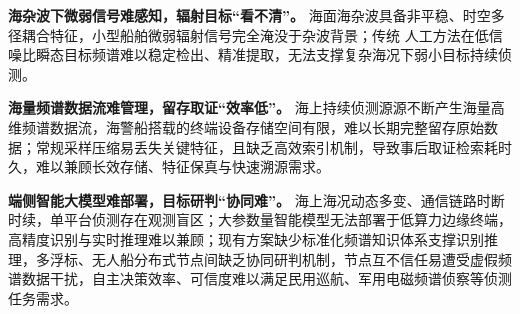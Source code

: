 \textbf{海杂波下微弱信号难感知，辐射目标“看不清”。}
海面海杂波具备非平稳、时空多径耦合特征，小型船舶微弱辐射信号完全淹没于杂波背景；传统
人工方法在低信噪比瞬态目标频谱难以稳定检出、精准提取，无法支撑复杂海况下弱小目标持续侦测。

\textbf{海量频谱数据流难管理，留存取证“效率低”。}
海上持续侦测源源不断产生海量高维频谱数据流，海警船搭载的终端设备存储空间有限，难以长期完整留存原始数据；常规采样压缩易丢失关键特征，且缺乏高效索引机制，导致事后取证检索耗时久，难以兼顾长效存储、特征保真与快速溯源需求。

\textbf{端侧智能大模型难部署，目标研判“协同难”。}
海上海况动态多变、通信链路时断时续，单平台侦测存在观测盲区；大参数量智能模型无法部署于低算力边缘终端，高精度识别与实时推理难以兼顾；现有方案缺少标准化频谱知识体系支撑识别推理，多浮标、无人船分布式节点间缺乏协同研判机制，节点互不信任易遭受虚假频谱数据干扰，自主决策效率、可信度难以满足民用巡航、军用电磁频谱侦察等侦测任务需求。



